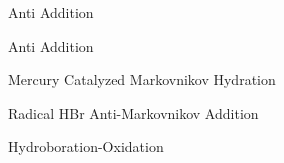 \documentclass[10pt]{article}
\begin{document}
      \begin{core}{ Anti Addition}

      \end{core}

      \begin{core}{ Anti Addition}

      \end{core}

      \begin{core}{Mercury Catalyzed Markovnikov Hydration}

      \end{core}

      \begin{core}{Radical HBr Anti-Markovnikov Addition}

      \end{core}

      \begin{core}{Hydroboration-Oxidation}

      \end{core}
  
\end{document}
